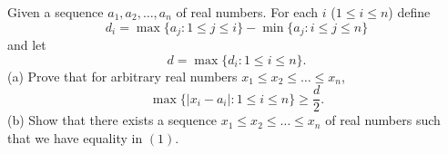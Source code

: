 Given a sequence $a_1, a_2, \ldots, a_n$ of real numbers. For each $i$ ($1 \leq i \leq n$) define
\[
d_i = \max\{a_j : 1 \leq j \leq i\} - \min\{a_j : i \leq j \leq n\}
\]
and let
\[
d = \max\{d_i : 1 \leq i \leq n\}.
\]
(a) Prove that for arbitrary real numbers $x_1 \leq x_2 \leq \ldots \leq x_n$,
\[
\max\{|x_i - a_i| : 1 \leq i \leq n\} \geq \frac{d}{2}. \tag{1}
\]
(b) Show that there exists a sequence $x_1 \leq x_2 \leq \ldots \leq x_n$ of real numbers such that we have equality in $(1)$.
